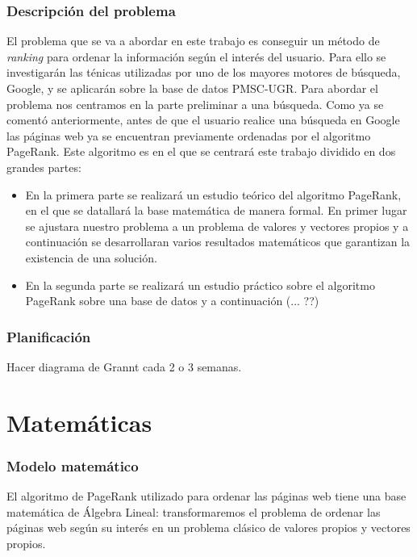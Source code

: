 \documentclass[size=a4, parskip=half, titlepage=false, toc=flat, toc=bib, 12pt]{scrartcl}
\theoremstyle{theorem-style}
\theoremstyle{definition-style}
\theoremstyle{remark-style}
\theoremstyle{example-style}
\theoremstyle{definition-style}
\theoremstyle{remark-style}
\begin{document}
\begin{itemize}
\end{itemize}

\newpage

\section{Descripción del problema}
El problema que se va a abordar en este trabajo es conseguir un método de \textit{ranking} para ordenar la información según el interés del usuario. Para ello se investigarán las ténicas utilizadas por uno de los mayores motores de búsqueda, Google, y se aplicarán sobre la base de datos PMSC-UGR. Para abordar el problema nos centramos en la parte preliminar a una búsqueda. Como ya se comentó anteriormente, antes de que el usuario realice una búsqueda en Google las páginas web ya se encuentran previamente ordenadas por el algoritmo PageRank. Este algoritmo  es en el que se centrará este trabajo dividido en dos grandes partes:
\begin{itemize}
\item En la primera parte se realizará un estudio teórico del algoritmo PageRank, en el que se datallará la base matemática de manera formal. En primer lugar se ajustara nuestro problema a un problema de valores y vectores propios y a continuación se desarrollaran varios resultados matemáticos que garantizan la existencia de una solución.
\item En la segunda parte se realizará un estudio práctico sobre el algoritmo PageRank sobre una base de datos y a continuación (... ??)
\end{itemize}

\section{Planificación}
Hacer diagrama de Grannt cada 2 o 3 semanas.

\newpage

\part{Matemáticas}

\section{Modelo matemático}

El algoritmo de PageRank utilizado para ordenar las páginas web tiene una base matemática de Álgebra Lineal: transformaremos el problema de ordenar las páginas web según su interés en un problema clásico de valores propios y vectores propios.
\end{document}
